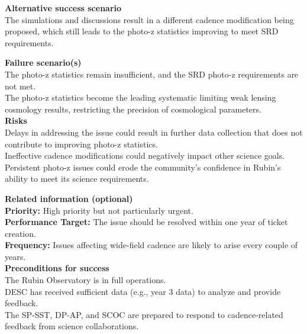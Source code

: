 \textbf{Alternative success scenario} \\
The simulations and discussions result in a different cadence modification being proposed, which still leads to the photo-z statistics improving to meet SRD requirements.

\textbf{Failure scenario(s)} \\
The photo-z statistics remain insufficient, and the SRD photo-z requirements are not met. \\
The photo-z statistics become the leading systematic limiting weak lensing cosmology results, restricting the precision of cosmological parameters. \\

\textbf{Risks} \\
Delays in addressing the issue could result in further data collection that does not contribute to improving photo-z statistics. \\
Ineffective cadence modifications could negatively impact other science goals. \\
Persistent photo-z issues could erode the community’s confidence in Rubin's ability to meet its science requirements.

\textbf{Related information (optional)} \\
\textbf{Priority:} High priority but not particularly urgent. \\
\textbf{Performance Target:} The issue should be resolved within one year of ticket creation. \\
\textbf{Frequency:} Issues affecting wide-field cadence are likely to arise every couple of years. \\

\textbf{Preconditions for success} \\
The Rubin Observatory is in full operations. \\
DESC has received sufficient data (e.g., year 3 data) to analyze and provide feedback. \\
The SP-SST, DP-AP, and SCOC are prepared to respond to cadence-related feedback from science collaborations.\\
